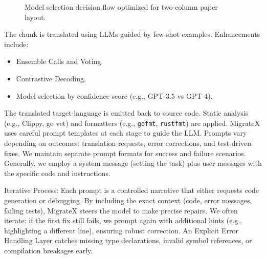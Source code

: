 \documentclass[twocolumn]{article}
\begin{document}
    \begin{figure}[htbp]
        \centering
        \caption{{Model selection decision flow optimized for two-column paper layout.}}
        \label{fig:model_selection_compact}
        \end{figure}
        
        

The chunk is translated using LLMs guided by few-shot examples. Enhancements include:

\begin{itemize}
    \item Ensemble Calls and Voting.
    \item Contrastive Decoding.
    \item Model selection by confidence score (e.g., GPT-3.5 vs GPT-4).
\end{itemize}

The translated target-language is emitted back to source code. Static analysis (e.g., Clippy, go vet) and formatters (e.g., \texttt{gofmt}, \texttt{rustfmt}) are applied.
MigrateX uses careful prompt templates at each stage to guide the LLM. Prompts vary depending on outcomes: translation requests, error corrections, and test-driven fixes. We maintain separate prompt formats for success and failure scenarios. Generally, we employ a system message (setting the task) plus user messages with the specific code and instructions.

    {Iterative Process}: Each prompt is a controlled narrative that either requests code generation or debugging. By including the exact context (code, error messages, failing tests), MigrateX steers the model to make precise repairs. We often iterate: if the first fix still fails, we prompt again with additional hints (e.g., highlighting a different line), ensuring robust correction. An Explicit Error Handling Layer catches missing type declarations, invalid symbol references, or compilation breakages early.
\end{document}
